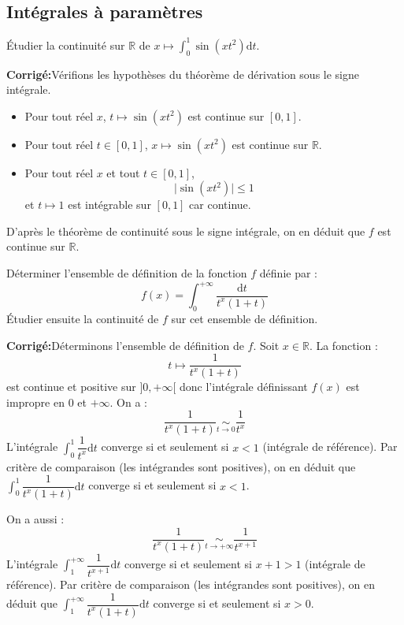 \documentclass[a4paper,twoside,french,11pt]{VcCours}
\newcommand{\dt}{\text{d}t}
\newcommand{\corr}{\textbf{Corrigé:}}
\begin{document}
\subsection{Intégrales à paramètres}


\begin{Exercice}{} Étudier la continuité sur $\mathbb{R}$ de $x \mapsto \int_{0}^1 \sin(xt^2) \dt$.
\end{Exercice}

\corr Vérifions les hypothèses du théorème de dérivation sous le signe intégrale.

\begin{itemize}
\item Pour tout réel $x$, $t \mapsto \sin(xt^2)$ est continue sur $[0,1]$.
\item Pour tout réel $t \in [0,1]$,  $x \mapsto \sin(xt^2)$ est continue sur $\mathbb{R}$.
\item Pour tout réel $x$ et tout $t \in [0,1]$,
$$ \vert \sin(x t^2) \vert \leq 1$$
et $t \mapsto 1$ est intégrable sur $[0,1]$ car continue.
\end{itemize}
D'après le théorème de continuité sous le signe intégrale, on en déduit que $f$ est continue sur $\mathbb{R}$.


\begin{Exercice}{} Déterminer l'ensemble de définition de la fonction $f$ définie par :
$$ f(x) = \int_{0}^{+ \infty} \dfrac{\dt}{t^x(1+t)}$$
Étudier ensuite la continuité de $f$ sur cet ensemble de définition.
\end{Exercice}

\corr Déterminons l'ensemble de définition de $f$. Soit $x \in \mathbb{R}$. La fonction :
$$ t \mapsto  \dfrac{1}{t^x(1+t)}$$
est continue  et positive sur $]0, + \infty[$ donc l'intégrale définissant $f(x)$ est impropre en $0$ et $+ \infty$. On a :
$$  \dfrac{1}{t^x(1+t)} \underset{t \rightarrow 0}{\sim} \dfrac{1}{t^x}$$
L'intégrale $\int_{0}^1 \dfrac{1}{t^x} \dt$ converge si et seulement si $x<1$ (intégrale de référence). Par critère de comparaison (les intégrandes sont positives), on en déduit que $\int_{0}^1 \dfrac{1}{t^x(1+t)} \dt$ converge si et seulement si $x<1$.


\noindent On a aussi :
$$   \dfrac{1}{t^x(1+t)} \underset{t \rightarrow + \infty}{\sim} \dfrac{1}{t^{x+1}}$$
L'intégrale $\int_{1}^{+ \infty} \dfrac{1}{t^{x+1}} \dt$ converge si et seulement si $x+1>1$ (intégrale de référence). Par critère de comparaison (les intégrandes sont positives), on en déduit que $\int_{1}^{+ \infty} \dfrac{1}{t^x(1+t)} \dt$ converge si et seulement si $x>0$.
\end{document}

